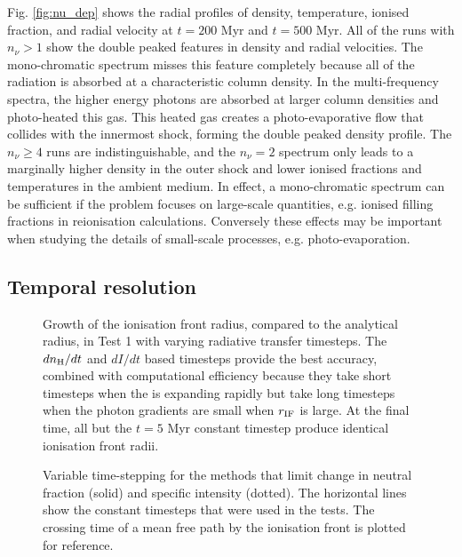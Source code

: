 \documentclass[useAMS,usenatbib]{mn2e}
\begin{document}
Fig. \ref{fig:nu_dep} shows the radial profiles of density,
temperature, ionised fraction, and radial velocity at $t = 200$ Myr
and $t = 500$ Myr.  All of the runs with $n_\nu > 1$ show the double
peaked features in density and radial velocities.  The mono-chromatic
spectrum misses this feature completely because all of the radiation
is absorbed at a characteristic column density.  In the
multi-frequency spectra, the higher energy photons are absorbed at
larger column densities and photo-heated this gas.  This heated gas
creates a photo-evaporative flow that collides with the innermost
shock, forming the double peaked density profile.  The $n_\nu \ge 4$
runs are indistinguishable, and the $n_\nu = 2$ spectrum only leads to
a marginally higher density in the outer shock and lower ionised
fractions and temperatures in the ambient medium.  In effect, a
mono-chromatic spectrum can be sufficient if the problem focuses on
large-scale quantities, e.g. ionised filling fractions in reionisation
calculations.  Conversely these effects may be important when studying
the details of small-scale processes, e.g. photo-evaporation.

\subsection{Temporal resolution}
\label{sec:dt_dep}

\begin{figure}
  \caption{\label{fig:dt_dep1} Growth of the ionisation front radius,
    compared to the analytical radius, in Test 1 with varying
    radiative transfer timesteps.  The $dn_{\rm H}/dt$ and $dI/dt$
    based timesteps provide the best accuracy, combined with
    computational efficiency because they take short timesteps when
    the \hii is expanding rapidly but take long timesteps when
    the photon gradients are small when $r_{\rm IF}$ is large.  At the
    final time, all but the $t = 5$ Myr constant timestep produce
    identical ionisation front radii.}
\end{figure}
\begin{figure}
  \caption{\label{fig:dt_dep2} Variable time-stepping for the methods
    that limit change in neutral fraction (solid) and specific
    intensity (dotted).  The horizontal lines show the constant
    timesteps that were used in the tests.  The crossing time of a
    mean free path by the ionisation front is plotted for reference.}
\end{figure}
\end{document}
